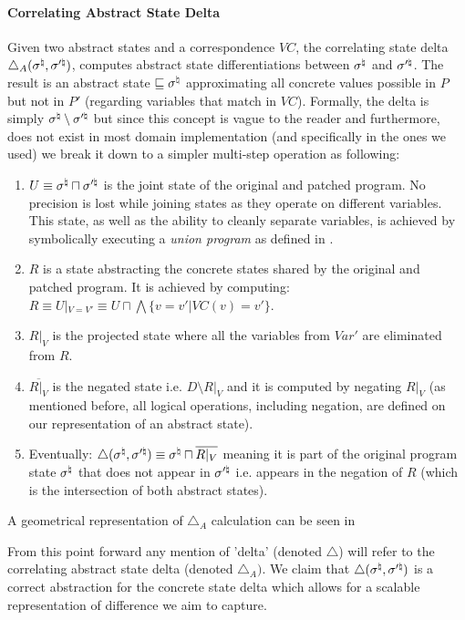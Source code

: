 \paragraph{Correlating Abstract State Delta} 
Given two abstract states and a correspondence $VC$,  the correlating state delta $\triangle_{A}(\sigma^\natural,\sigma'^\natural)$, computes abstract state differentiations between $\sigma^\natural$ and $\sigma'^\natural$. The result is an abstract state $\sqsubseteq \sigma^\natural$ approximating all concrete values possible in $P$ but not in $P'$ (regarding variables that match in $VC$). Formally, the delta is simply $\sigma^\natural \setminus \sigma'^\natural$ but since this concept is vague to the reader and furthermore, does not exist in most domain implementation (and specifically in the ones we used) we break it down to a simpler multi-step operation as following:
\begin{enumerate}
\item $U \equiv \sigma^\natural \sqcap \sigma'^\natural$ is the joint state of the original and patched program. No precision is lost while joining states as they operate on different variables. This state, as well as the ability to cleanly separate variables, is achieved by symbolically executing a \emph{union program} as defined in .
\item $R$ is a state abstracting the concrete states shared by the original and patched program. It is achieved by computing: $R \equiv U|_{V=V'} \equiv U \sqcap \bigwedge\{ v = v' | VC(v) = v'\}$.
\item $R|_V$ is the projected state where all the variables from $Var'$ are eliminated from $R$.
\item $\overline{R|_V}$ is the negated state i.e. $D \setminus R|_V$ and it is computed by negating $R|_V$ (as mentioned before, all logical operations, including negation, are defined on our representation of an abstract state).
\item Eventually: $\triangle(\sigma^\natural,\sigma'^\natural) \equiv \sigma^\natural \sqcap \overline{R|_V}$ meaning it is part of the original program state $\sigma^\natural$ that does not appear in $\sigma'^\natural$ i.e. appears in the negation of $R$ (which is the intersection of both abstract states).
\end{enumerate}




A geometrical representation of $\triangle_{A}$ calculation can be seen in \figref{}

From this point forward any mention of 'delta' (denoted $\triangle$) will refer to the correlating abstract state delta (denoted $\triangle_{A})$. We claim that $\triangle(\sigma^\natural,\sigma'^\natural)$ is a correct abstraction for the concrete state delta which allows for a scalable representation of difference we aim to capture.

